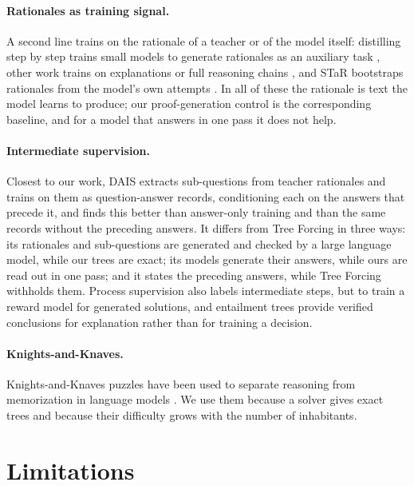 \documentclass[10pt]{article}
\newcommand{\tf}{Tree Forcing}
\begin{document}
\paragraph{Rationales as training signal.} A second line trains on the rationale of a teacher or of the model itself:
distilling step by step trains small models to generate rationales as an auxiliary task \citep{hsieh2023dss}, other
work trains on explanations or full reasoning chains \citep{li2022explanations,ho2023teachers,shridhar2023socratic},
and STaR bootstraps rationales from the model's own attempts \citep{zelikman2022star}. In all of these the rationale is
text the model learns to produce; our proof-generation control is the corresponding baseline, and for a model that
answers in one pass it does not help.

\paragraph{Intermediate supervision.} Closest to our work, DAIS \citep{dais2026} extracts sub-questions from teacher
rationales and trains on them as question-answer records, conditioning each on the answers that precede it, and finds
this better than answer-only training and than the same records without the preceding answers. It differs from \tf{}
in three ways: its rationales and sub-questions are generated and checked by a large language model, while our trees
are exact; its models generate their answers, while ours are read out in one pass; and it states the preceding
answers, while \tf{} withholds them. Process supervision \citep{lightman2023verify} also labels intermediate steps, but
to train a reward model for generated solutions, and entailment trees \citep{dalvi2021entailmentbank} provide verified
conclusions for explanation rather than for training a decision.

\paragraph{Knights-and-Knaves.} Knights-and-Knaves puzzles have been used to separate reasoning from memorization in
language models \citep{xie2024kk}. We use them because a solver gives exact trees and because their difficulty grows
with the number of inhabitants.

\section{Limitations}
\label{sec:limitations}
\end{document}

